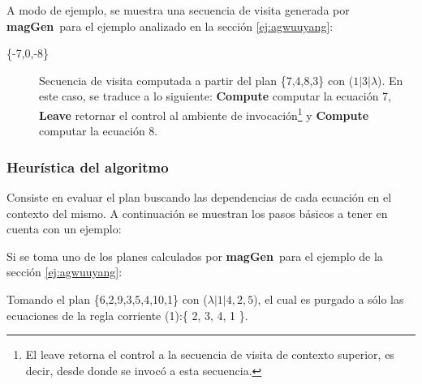 \documentclass[runningheads,a4paper]{llncs}
\newcommand{\maggen}{\textbf{magGen}}
\begin{document}
A modo de ejemplo, se muestra una secuencia de visita generada por \maggen\ para el ejemplo analizado en la sección \ref{ej:agwuuyang}:

\begin{description}
\item [\{-7,0,-8\}] Secuencia de visita computada a partir del plan \{7,4,8,3\} con  ($ 1 | 3 | \lambda$). En este caso, se traduce a lo siguiente:
\textbf{Compute} computar la ecuación 7, \textbf{Leave} retornar el control al ambiente de invocación\footnote{El leave retorna el control a la secuencia de visita de contexto superior, es decir, desde donde se invocó a esta secuencia.} y \textbf{Compute} computar la ecuación 8.

\end{description}

\subsubsection{Heurística del algoritmo}
\label{subsec:heuris-simul}

Consiste en evaluar el plan buscando las dependencias de cada ecuación en el contexto del mismo. A continuación se muestran los pasos básicos a tener en cuenta con un ejemplo:

Si se toma uno de los planes calculados por \maggen\ para el ejemplo de la sección \ref{ej:agwuuyang}:

Tomando el plan \{6,2,9,3,5,4,10,1\} con ($\lambda| 1 | 4,2,5$), el cual es purgado a sólo las ecuaciones de la regla corriente (1):\{ 2, 3, 4, 1 \}.
\end{document}
